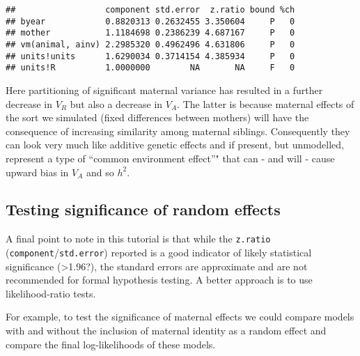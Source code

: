 \documentclass[12pt,]{book}
\newenvironment{Shaded}{\begin{snugshade}}{\end{snugshade}}
\newcommand{\KeywordTok}[1]{\textcolor[rgb]{0.13,0.29,0.53}{\textbf{#1}}}
\newcommand{\NormalTok}[1]{#1}
\newcommand{\OperatorTok}[1]{\textcolor[rgb]{0.81,0.36,0.00}{\textbf{#1}}}
\begin{document}
\begin{Shaded}
\end{Shaded}

\begin{verbatim}
##                  component std.error  z.ratio bound %ch
## byear            0.8820313 0.2632455 3.350604     P   0
## mother           1.1184698 0.2386239 4.687167     P   0
## vm(animal, ainv) 2.2985320 0.4962496 4.631806     P   0
## units!units      1.6290034 0.3714154 4.385934     P   0
## units!R          1.0000000        NA       NA     F   0
\end{verbatim}

Here partitioning of significant maternal variance has resulted in a further decrease in \(V_R\) but also a decrease in \(V_A\). The latter is because maternal effects of the sort we simulated (fixed differences between mothers) will have the consequence of increasing similarity among maternal siblings. Consequently they can look very much like additive genetic effects and if present, but unmodelled, represent a type of ``common environment effect''" that can - and will - cause upward bias in \(V_A\) and so \(h^2\).

\hypertarget{testing-significance-of-random-effects}{%
\subsection{Testing significance of random effects}\label{testing-significance-of-random-effects}}

A final point to note in this tutorial is that while the \texttt{z.ratio} (\texttt{component}/\texttt{std.error}) reported is a good indicator of likely statistical significance (\textgreater{}1.96?), the standard errors are approximate and are not recommended for formal hypothesis testing. A better approach is to use likelihood-ratio tests.

For example, to test the significance of maternal effects we could compare models with and without the inclusion of maternal identity as a random effect and compare the final log-likelihoods of these models.

\begin{Shaded}
\end{Shaded}
\end{document}

